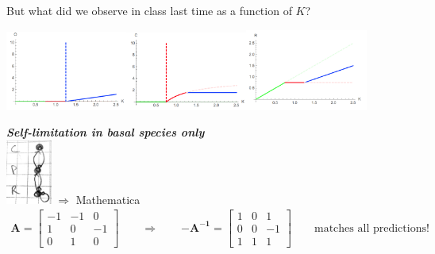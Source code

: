 \documentclass{article}
\newcommand{\ind}{\-\hspace{1cm}}
\begin{document}
But what did we observe in class last time as a function of $K$?
\begin{center}
\includegraphics[width=4cm]{figs/TC_R.png}\ind \includegraphics[width=4cm]{figs/TC_C.png}\ind \includegraphics[width=4cm]{figs/TC_P.png}
\end{center}
\emph{\textbf{Self-limitation in basal species only}}\\
\ind \includegraphics[width=1.5cm]{figs/TC_basal.pdf}
 $\Rightarrow$ Mathematica
\begin{align*}
	\mathbf{A}=\begin{bmatrix} -1 & -1 & 0 \\ 1 & 0 & -1 \\ 0 & 1 & 0 \end{bmatrix} \qquad \Rightarrow \qquad \mathbf{-A^{-1}}=\begin{bmatrix} 1 & 0 & 1 \\ 0 & 0 & -1 \\ 1 & 1 & 1 \end{bmatrix} \qquad \text{matches all predictions!}
\end{align*}
\end{document}
